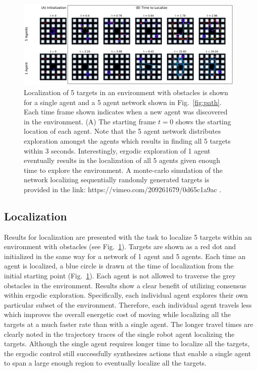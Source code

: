\documentclass[letterpaper, 10 pt,  conference, twoside]{IEEEtran/IEEEtran}
\theoremstyle{definition}
\begin{document}
\begin{figure}[th!]
\centering
\includegraphics[scale=0.9]{figures/distr_loc2.eps}
\caption{ Localization of 5 targets in an environment with obstacles is shown for a single agent and a 5 agent network shown in Fig.~\ref{fig:path}. Each time frame shown indicates when a new agent was discovered in the environment. (A) The starting frame $t=0$ shows the starting location of each agent. Note that the 5 agent network distributes exploration amongst the agents which results in finding all 5 targets within $3$ seconds. Interestingly, ergodic exploration of 1 agent eventually results in the localization of all 5 agents given enough time to explore the environment. A monte-carlo simulation of the network localizing sequentially randomly generated targets is provided in the link: https://vimeo.com/209261679/0d65c1a9ac .}
\label{fig:disloc}
\end{figure}

\subsection{Localization}

Results for localization are presented with the task to localize 5 targets within an environment with obstacles (see Fig.~\ref{fig:disloc}). Targets are shown as a red dot and initialized in the same way for a network of 1 agent and 5 agents. Each time an agent is localized, a blue circle is drawn at the time of localization from the initial starting point (Fig.~\ref{fig:disloc}). Each agent is not allowed to traverse the grey obstacles in the environment. Results show a clear benefit of utilizing consensus within ergodic exploration. Specifically, each individual agent explores their own particular subset of the environment. Therefore, each individual agent travels less which improves the overall energetic cost of moving while localizing all the targets at a much faster rate than with a single agent. The longer travel times are clearly noted in the trajectory traces of the single robot agent localizing the targets. Although the single agent requires longer time to localize all the targets, the ergodic control still successfully synthesizes actions that enable a single agent to span a large enough region to eventually localize all the targets.
\end{document}

